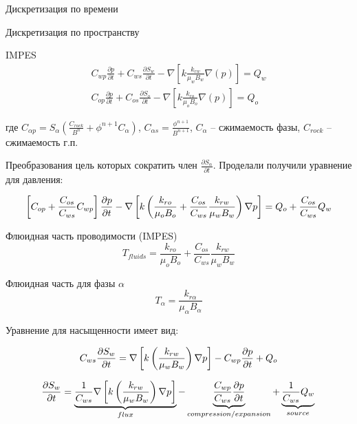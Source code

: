 \documentclass[14pt]{article}
\begin{document}
	Дискретизация по времени
	
	
	Дискретизация по пространству
	
	
	IMPES
	\begin{eqnarray}
		C_{wp} \frac{\partial p}{\partial t} +
		C_{ws} \frac{\partial S_{w}}{\partial t} -
		\nabla \left[ k \frac{k_{rw}}{\mu_{w} B_{w}} \nabla \left( p \right) \right] = Q_{w} \\
		C_{op} \frac{\partial p}{\partial t} +
		C_{os} \frac{\partial S_{o}}{\partial t} -
		\nabla \left[ k \frac{k_{ro}}{\mu_{o} B_{o}} \nabla \left( p \right) \right] = Q_{o}	
	\end{eqnarray}
	
	
	где $C_{\alpha p} = S_{\alpha} \left( \frac{C_{rock}}{B^{n}} + \phi^{n+1} C_{\alpha} \right)$, $C_{\alpha s} = \frac{\phi^{n+1}}{B^{n+1}}$, $C_{\alpha}$ -- сжимаемость фазы, $C_{rock}$ -- сжимаемость г.п.

	Преобразования цель которых сократить член $\frac{\partial S_{\alpha}}{\partial t}$. Проделали получили уравнение для давления:
	
	\begin{equation}
		\left[ C_{op} + \frac{C_{os}}{C_{ws}} C_{wp} \right] \frac{\partial p}{\partial t} -
		\nabla \left[ k \left( \frac{k_{ro}}{\mu_{o} B_{o}} + \frac{C_{os}}{C_{ws}} \frac{k_{rw}}{\mu_{w} B_{w}} \right) \nabla p  \right] = Q_{o} + \frac{C_{os}}{C_{ws}} Q_{w} \\
	\end{equation}
	
	Флюидная часть проводимости (IMPES)
	\begin{equation}
		T_{fluids} = \frac{k_{ro}}{\mu_{o} B_{o}} + \frac{C_{os}}{C_{ws}} \frac{k_{rw}}{\mu_{w} B_{w}}
	\end{equation}
	
	Флюидная часть для фазы $\alpha$
	\begin{equation}
		T_{\alpha} = \frac{k_{r \alpha}}{\mu_{\alpha} B_{\alpha}} 
	\end{equation}
	
	Уравнение для насыщенности имеет вид:
	
	\begin{equation}
		C_{ws} \frac{\partial S_{w}}{\partial t} = 
		\nabla \left[ k \left( \frac{k_{rw}}{\mu_{w} B_{w}} \right) \nabla p \right] -
		C_{wp} \frac{\partial p}{\partial t} + 
		Q_{o} \\
	\end{equation}
	
	\begin{equation}
		\frac{\partial S_{w}}{\partial t} =  
		\underbrace{ \frac{1}{C_{ws}} 
		\nabla \left[ k \left( \frac{k_{rw}}{\mu_{w} B_{w}} \right) \nabla p \right] }_{flux} -
		\underbrace{ \frac{C_{wp}}{C_{ws}} \frac{\partial p}{\partial t} }_{compression/expansion} + 
		\underbrace{ \frac{1}{C_{ws}} Q_{w} }_{source} \\
	\end{equation}
	
\end{document}
